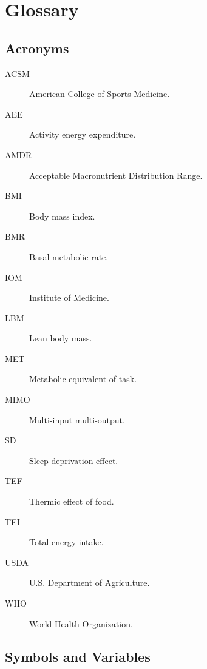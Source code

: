 
\section{Glossary}

\subsection{Acronyms}

\begin{description}
\item[ACSM] American College of Sports Medicine.
\item[AEE] Activity energy expenditure.
\item[AMDR] Acceptable Macronutrient Distribution Range.
\item[BMI] Body mass index.
\item[BMR] Basal metabolic rate.
\item[IOM] Institute of Medicine.
\item[LBM] Lean body mass.
\item[MET] Metabolic equivalent of task.
\item[MIMO] Multi-input multi-output.
\item[SD] Sleep deprivation effect.
\item[TEF] Thermic effect of food.
\item[TEI] Total energy intake.
\item[USDA] U.S. Department of Agriculture.
\item[WHO] World Health Organization.
\end{description}

\subsection{Symbols and Variables}


